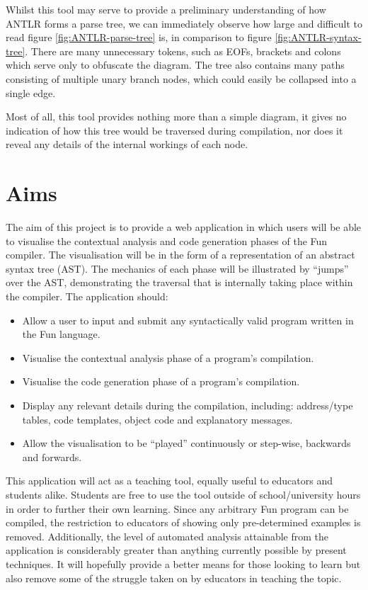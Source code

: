 \documentclass{l4proj}
\begin{document}
Whilst this tool may serve to provide a preliminary understanding of how ANTLR forms a parse tree, we can immediately observe how large and difficult to read figure \ref{fig:ANTLR-parse-tree} is, in comparison to figure \ref{fig:ANTLR-syntax-tree}. There are many unnecessary tokens, such as EOFs, brackets and colons which serve only to obfuscate the diagram. The tree also contains many paths consisting of multiple unary branch nodes, which could easily be collapsed into a single edge.

Most of all, this tool provides nothing more than a simple diagram, it gives no indication of how this tree would be traversed during compilation, nor does it reveal any details of the internal workings of each node.

\section{Aims}
The aim of this project is to provide a web application in which users will be able to visualise the contextual analysis and code generation phases of the Fun compiler. The visualisation will be in the form of a representation of an abstract syntax tree (AST). The mechanics of each phase will be illustrated by ``jumps'' over the AST, demonstrating the traversal that is internally taking place within the compiler. The application should:
\begin{itemize}
\item Allow a user to input and submit any syntactically valid program written in the Fun language.
\item Visualise the contextual analysis phase of a program's compilation. 
\item Visualise the code generation phase of a program's compilation.
\item Display any relevant details during the compilation, including: address/type tables, code templates, object code and explanatory messages.
\item Allow the visualisation to be ``played'' continuously or step-wise, backwards and forwards.
\end{itemize}

This application will act as a teaching tool, equally useful to educators and students alike. Students are free to use the tool outside of school/university hours in order to further their own learning. Since any arbitrary Fun program can be compiled, the restriction to educators of showing only pre-determined examples is removed. Additionally, the level of automated analysis attainable from the application is considerably greater than anything currently possible by present techniques. It will hopefully provide a better means for those looking to learn but also remove some of the struggle taken on by educators in teaching the topic.
\end{document}
